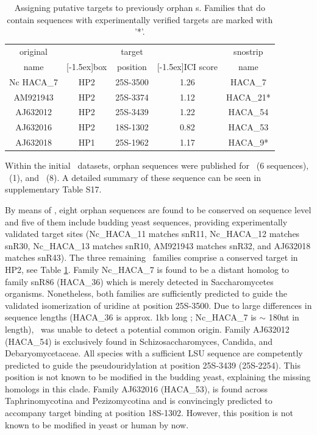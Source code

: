 \begin{table}
  \caption[Potential targets for orphan \haca s.]{Assigning putative targets to previously
    orphan \haca s. Families that do contain sequences with
    experimentally verified targets are marked with '*'. }
  \label{tab:orphan_hacas_short}
  \begin{center}
    \begin{footnotesize}
      \begin{tabular}{c|c|c|c|c}
        original&&target&&snostrip\\
        name&\raisebox{1.5ex}[-1.5ex]{box}&position&\raisebox{1.5ex}[-1.5ex]{ICI
            score}&name\\
        \hline
        Nc HACA\_7&HP2&25S-3500&1.26&HACA\_7\\
        AM921943&HP2&25S-3374&1.12&HACA\_21*\\
        AJ632012&HP2&25S-3439&1.22&HACA\_54\\
        AJ632016&HP2&18S-1302&0.82&HACA\_53\\
        AJ632018&HP1&25S-1962&1.17&HACA\_9*\\
      \end{tabular}
    \end{footnotesize}
  \end{center}
\end{table}

Within the initial \haca\ datasets, orphan sequences were
published for \ncr\ (6 sequences), \afu\ (1), and \spo\ (8).
A detailed summary of these sequence can be seen in supplementary Table S17.

By means of \snostrip, eight orphan sequences are found to be conserved on sequence level and five of them include budding yeast sequences, providing experimentally validated target sites (Nc\_HACA\_11 matches
snR11, Nc\_HACA\_12 matches snR30, Nc\_HACA\_13 matches snR10, AM921943
matches snR32, and AJ632018 matches snR43). The three remaining \sno\
families comprise a 
conserved target in HP2, see Table \ref{tab:orphan_hacas_short}. Family Nc\_HACA\_7 is found to be a distant
homolog to family snR86 (HACA\_36) which is merely detected in Saccharomycetes
organisms. Nonetheless, both families are sufficiently predicted to
guide the validated isomerization of uridine at position
25S-3500. Due to large differences in sequence lengths (HACA\_36 is approx. 1kb long
; Nc\_HACA\_7 is $\sim$ 180nt in length), \snostrip\ was unable to detect a
potential common origin. Family AJ632012 (HACA\_54) is exclusively found in Schizosaccharomyces,
Candida, and Debaryomycetaceae. All species with a sufficient LSU sequence
are competently predicted to guide the pseudouridylation at position
25S-3439 (\sce 25S-2254). This position is not known to be modified
in the budding yeast, 
explaining the missing homologs in this clade. Family AJ632016 (HACA\_53), is
found across Taphrinomycotina and Pezizomycotina and is convincingly
predicted to accompany target binding at position 18S-1302. However, this position is not known to be modified in yeast or human by now.

